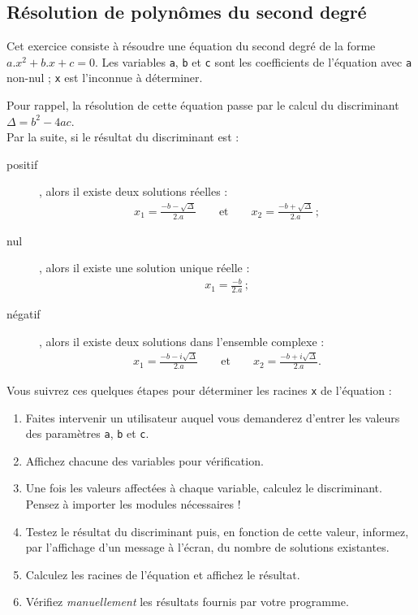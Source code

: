 
\subsection{Résolution de polynômes du second degré}

Cet exercice  consiste à résoudre une  équation du second degré  de la
forme  $a.x^2+b.x+c =  0$.   Les variables  \texttt{a}, \texttt{b}  et
\texttt{c}  sont  les  coefficients   de  l'équation  avec  \texttt{a}
non-nul ; \texttt{x} est l'inconnue à déterminer.

Pour rappel,  la résolution de cette  équation passe par le  calcul du
discriminant $\Delta =  b^2-4ac$.\\ Par la suite, si  le résultat du
discriminant est :
\begin{description}
\item[positif], alors il existe deux solutions réelles :
\begin{eqnarray*}
  x_1   =  \frac{-b-\sqrt{\Delta}}{2.a}   \qquad  \textrm{et}   \qquad
  x_2=\frac{-b+\sqrt{\Delta}}{2.a}\,;
\end{eqnarray*}
\item[nul], alors il existe une solution unique réelle :
\begin{eqnarray*}
  x_1 = \frac{-b}{2.a}\,;
\end{eqnarray*}
\item[négatif], alors il existe deux solutions dans l'ensemble complexe :
\begin{eqnarray*}
  x_1  =   \frac{-b-i\sqrt{\Delta}}{2.a}  \qquad   \textrm{et}  \qquad
  x_2=\frac{-b+i\sqrt{\Delta}}{2.a}.
\end{eqnarray*}
\end{description}

Vous  suivrez  ces quelques  étapes  pour  déterminer les racines
\texttt{x} de l'équation :


\begin{enumerate}

\item Faites intervenir un utilisateur auquel vous demanderez d'entrer
  les valeurs des paramètres \texttt{a}, \texttt{b} et \texttt{c}.
\item Affichez chacune des variables pour vérification.
\item  Une fois  les  valeurs affectées à chaque variable, calculez  le
  discriminant.\\ Pensez à importer les modules nécessaires !
\item  Testez le  résultat du  discriminant  puis, en  fonction de  cette
  valeur, informez, par l'affichage d'un  message à l'écran, du nombre
  de solutions existantes.
\item Calculez  les racines de l'équation et affichez  le résultat.
\item Vérifiez \emph{manuellement} les résultats fournis par votre programme.

\end{enumerate}
